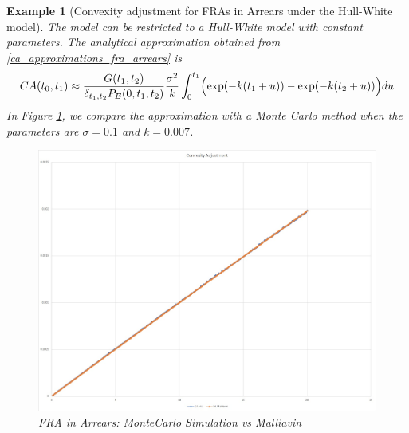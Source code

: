 \documentclass[a4paper,10pt]{article}
\newtheorem{example}[theorem]{Example}
\newcommand{\1}{\mathbf{1}}
\begin{document}
\begin{example}[Convexity adjustment for FRAs in Arrears under the Hull-White model]\label{example_convexity_hw_FRAsinArrears}
The model can be restricted to a Hull-White model with constant parameters. The analytical approximation obtained from \eqref{ca_approximations_fra_arrears} is
\begin{equation*}
CA(t_0,t_1) \approx \frac{G(t_1,t_2)}{\delta_{t_1,t_2}P_{E}(0,t_1,t_2)}  \frac{\sigma^{2}}{k} \int_{0}^{t_1} \Bigl(\exp(- k(t_1 + u)) -   \exp(- k(t_2 + u))\Bigr) du 
\end{equation*}
In Figure \ref{fig:FRA_HW}, we compare the approximation with a Monte Carlo method when the parameters are $\sigma=0.1$ and $k=0.007$.
\begin{figure}[H]
		\begin{center}
		\includegraphics[scale=0.3]{Figures/fra_convexity.jpg}
		\end{center}
		\caption{FRA in Arrears: MonteCarlo Simulation vs Malliavin}
		\label{fig:FRA_HW}
\end{figure}
\end{example}
\end{document}
